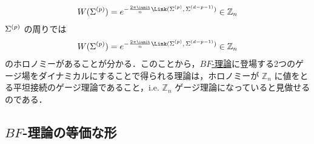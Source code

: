 \documentclass[TQFT_main]{subfiles}
\begin{document}
\begin{align}
    \label{eq:BF-1-W1}
    W(\mfd{\Sigma}{p}) = e^{-\frac{2\pi \iunit}{n} \Link(\mfd{\Sigma}{p},\, \mfd{\Sigma}{d-p-1})} \in \mathbb{Z}_n
\end{align}
$\Sigma^{(p)}$ の周りでは
\begin{align}
    \label{eq:BF-1-W2}
    W(\mfd{\Sigma}{p}) = e^{-\frac{2\pi \iunit}{n} \Link(\mfd{\Sigma}{p},\, \mfd{\Sigma}{d-p-1})} \in \mathbb{Z}_n
\end{align}
のホロノミーがあることが分かる．このことから，\hyperref[def:BF]{$BF$-理論}に登場する2つのゲージ場をダイナミカルにすることで得られる理論は，ホロノミーが $\mathbb{Z}_n$ に値をとる平坦接続のゲージ理論であること，i.e. $\mathbb{Z}_n$ ゲージ理論になっていると見做せるのである．

\subsection{$BF$-理論の等価な形}
\end{document}
